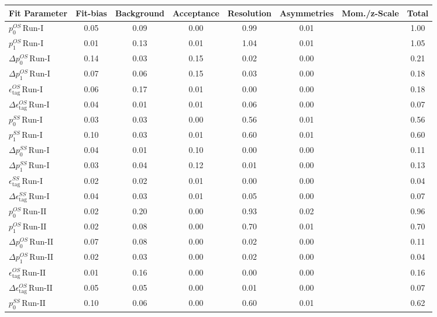 \begin{tabular}{l  c  c  c  c  c  c  | c }
\hline
\hline
Fit Parameter & Fit-bias & Background & Acceptance & Resolution & Asymmetries & Mom./z-Scale &  Total  \\ 
\hline
$p_{0}^{OS} \, \text{Run-I}$ & 0.05 & 0.09 & 0.00 & 0.99 & 0.01 &  & 1.00 \\ 
$p_{1}^{OS} \, \text{Run-I}$ & 0.01 & 0.13 & 0.01 & 1.04 & 0.01 &  & 1.05 \\ 
$\Delta p_{0}^{OS} \, \text{Run-I}$ & 0.14 & 0.03 & 0.15 & 0.02 & 0.00 &  & 0.21 \\ 
$\Delta p_{1}^{OS} \, \text{Run-I}$ & 0.07 & 0.06 & 0.15 & 0.03 & 0.00 &  & 0.18 \\ 
$\epsilon_{\text{tag}}^{OS} \, \text{Run-I}$ & 0.06 & 0.17 & 0.01 & 0.00 & 0.00 &  & 0.18 \\ 
$\Delta \epsilon_{\text{tag}}^{OS} \, \text{Run-I}$ & 0.04 & 0.01 & 0.01 & 0.06 & 0.00 &  & 0.07 \\ 
$p_{0}^{SS} \, \text{Run-I}$ & 0.03 & 0.03 & 0.00 & 0.56 & 0.01 &  & 0.56 \\ 
$p_{1}^{SS} \, \text{Run-I}$ & 0.10 & 0.03 & 0.01 & 0.60 & 0.01 &  & 0.60 \\ 
$\Delta p_{0}^{SS} \, \text{Run-I}$ & 0.04 & 0.01 & 0.10 & 0.00 & 0.00 &  & 0.11 \\ 
$\Delta p_{1}^{SS} \, \text{Run-I}$ & 0.03 & 0.04 & 0.12 & 0.01 & 0.00 &  & 0.13 \\ 
$\epsilon_{\text{tag}}^{SS} \, \text{Run-I}$ & 0.02 & 0.02 & 0.01 & 0.00 & 0.00 &  & 0.04 \\ 
$\Delta \epsilon_{\text{tag}}^{SS} \, \text{Run-I}$ & 0.04 & 0.03 & 0.01 & 0.05 & 0.00 &  & 0.07 \\ 
$p_{0}^{OS} \, \text{Run-II}$ & 0.02 & 0.20 & 0.00 & 0.93 & 0.02 &  & 0.96 \\ 
$p_{1}^{OS} \, \text{Run-II}$ & 0.02 & 0.08 & 0.00 & 0.70 & 0.01 &  & 0.70 \\ 
$\Delta p_{0}^{OS} \, \text{Run-II}$ & 0.07 & 0.08 & 0.00 & 0.02 & 0.00 &  & 0.11 \\ 
$\Delta p_{1}^{OS} \, \text{Run-II}$ & 0.02 & 0.03 & 0.00 & 0.02 & 0.00 &  & 0.04 \\ 
$\epsilon_{\text{tag}}^{OS} \, \text{Run-II}$ & 0.01 & 0.16 & 0.00 & 0.00 & 0.00 &  & 0.16 \\ 
$\Delta \epsilon_{\text{tag}}^{OS} \, \text{Run-II}$ & 0.05 & 0.05 & 0.00 & 0.01 & 0.00 &  & 0.07 \\ 
$p_{0}^{SS} \, \text{Run-II}$ & 0.10 & 0.06 & 0.00 & 0.60 & 0.01 &  & 0.62 \\ 

\end{tabular}
